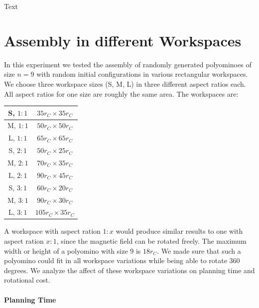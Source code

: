 Text




\section{Assembly in different Workspaces}
\label{sec:AFBS}

In this experiment we tested the assembly of randomly generated polyominoes of size $n=9$ with random initial configurations in various rectangular workspaces.
We choose three workspace sizes (S, M, L) in three different aspect ratios each.
All aspect ratios for one size are roughly the same area. The workspaces are:

\begin{center}
	\begin{tabular}{|c|c|}
		\hline
		S, $ 1:1 $ & $35 r_C \times 35 r_C$\\
		\hline
		M, $ 1:1 $ & $50 r_C \times 50 r_C$ \\
		\hline
		L, $ 1:1 $ & $65 r_C \times 65 r_C$ \\
		\hline
		S, $ 2:1 $ & $50 r_C \times 25 r_C$\\
		\hline
		M, $ 2:1 $ & $70 r_C \times 35 r_C$ \\
		\hline
		L, $ 2:1 $ & $90 r_C \times 45 r_C$ \\
		\hline
		S, $ 3:1 $ & $60 r_C \times 20 r_C$\\
		\hline
		M, $ 3:1 $ & $90 r_C \times 30 r_C$ \\
		\hline
		L, $ 3:1 $ & $105 r_C \times 35 r_C$ \\
		\hline
	\end{tabular}
\end{center}

A workspace with aspect ration $ 1:x $ would produce similar results to one with aspect ration $ x:1 $, since the magnetic field can be rotated freely.
The maximum width or height of a polyomino with size $9$ is $18 r_C$.
We made sure that such a polyomino could fit in all workspace variations while being able to rotate 360 degrees.
We analyze the affect of these workspace variations on planning time and rotational cost.

\paragraph{Planning Time} 


